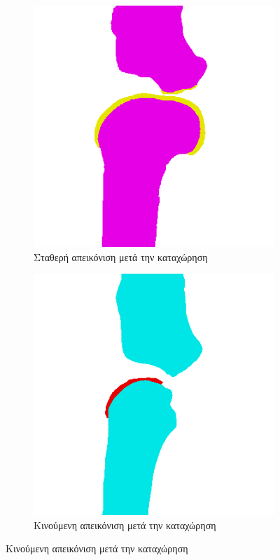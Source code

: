 \documentclass[a4paper,12pt]{article}
\begin{document}
\begin{figure}[H]
    \centering

    \begin{subfigure}[t]{0.4\linewidth}
    \includegraphics[width=\linewidth]{original_label_registration_1.png}
    \caption{Σταθερή απεικόνιση μετά την καταχώρηση}
    \end{subfigure}
    \begin{subfigure}[t]{0.4\linewidth}
    \includegraphics[width=\linewidth]{moving_label_before_registration_1.png}
    \caption{Κινούμενη απεικόνιση μετά την καταχώρηση}
    \end{subfigure}


\end{figure}
\end{document}

